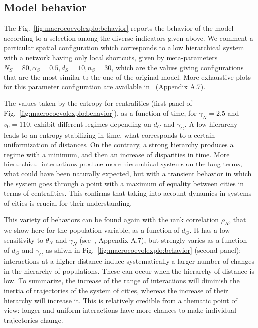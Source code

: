 \subsection{Model behavior}

The Fig.~\ref{fig:macrocoevolexplo:behavior} reports the behavior of the model according to a selection among the diverse indicators given above. We comment a particular spatial configuration which corresponds to a low hierarchical system with a network having only local shortcuts, given by meta-parameters $N_S=80,\alpha_S=0.5,d_S=10,n_S=30$, which are the values giving configurations that are the most similar to the one of the original model. More exhaustive plots for this parameter configuration are available in~\cite{raimbault:tel-01857741} (Appendix A.7).



The values taken by the entropy for centralities (first panel of Fig.~\ref{fig:macrocoevolexplo:behavior}), as a function of time, for $\gamma_N = 2.5$ and $v_0 = 110$, exhibit different regimes depending on $d_G$ and $\gamma_G$. A low hierarchy leads to an entropy stabilizing in time, what corresponds to a certain uniformization of distances. On the contrary, a strong hierarchy produces a regime with a minimum, and then an increase of disparities in time. More hierarchical interactions produce more hierarchical systems on the long terms, what could have been naturally expected, but with a transient behavior in which the system goes through a point with a maximum of equality between cities in terms of centralities. This confirms that taking into account dynamics in systems of cities is crucial for their understanding.


This variety of behaviors can be found again with the rank correlation $\rho_R$, that we show here for the population variable, as a function of $d_G$. It has a low sensitivity to $\theta_N$ and $\gamma_N$ (see~\cite{raimbault:tel-01857741}, Appendix A.7), but strongly varies as a function of $d_G$ and $\gamma_G$ as shiwn in Fig.~\ref{fig:macrocoevolexplo:behavior} (second panel): interactions at a higher distance induce systematically a larger number of changes in the hierarchy of populations. These can occur when the hierarchy of distance is low. To summarize, the increase of the range of interactions will diminish the inertia of trajectories of the system of cities, whereas the increase of their hierarchy will increase it. This is relatively credible from a thematic point of view: longer and uniform interactions have more chances to make individual trajectories change.



